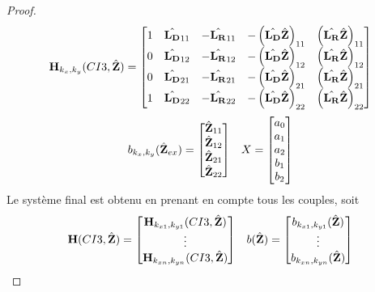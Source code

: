 \begin{proof}
  \begin{align*}
      \mathbf{H}_{k_{x},k_{y}}(CI3,\hat{\mathbf{Z}}) = \begin{bmatrix}
      1 & \hat{\mathbf{L_D}}_{11} & -\hat{\mathbf{L_R}}_{11} & -\left(\hat{\mathbf{L_D}}\hat{\mathbf{Z}}\right)_{11} & \left(\hat{\mathbf{L_R}}\hat{\mathbf{Z}}\right)_{11}
      \\
      0 & \hat{\mathbf{L_D}}_{12} & -\hat{\mathbf{L_R}}_{12} & -\left(\hat{\mathbf{L_D}}\hat{\mathbf{Z}}\right)_{12} & \left(\hat{\mathbf{L_R}}\hat{\mathbf{Z}}\right)_{12}
      \\
      0 & \hat{\mathbf{L_D}}_{21} & -\hat{\mathbf{L_R}}_{21} & -\left(\hat{\mathbf{L_D}}\hat{\mathbf{Z}}\right)_{21} & \left(\hat{\mathbf{L_R}}\hat{\mathbf{Z}}\right)_{21}
      \\
      1 & \hat{\mathbf{L_D}}_{22} & -\hat{\mathbf{L_R}}_{22} & -\left(\hat{\mathbf{L_D}}\hat{\mathbf{Z}}\right)_{22} & \left(\hat{\mathbf{L_R}}\hat{\mathbf{Z}}\right)_{22}
      \end{bmatrix}
  \end{align*}
  \begin{align*}
      b_{k_{x},k_{y}}(\hat{\mathbf{Z}}_{ex}) = \begin{bmatrix}
      \hat{\mathbf{Z}}_{11}
      \\
      \hat{\mathbf{Z}}_{12}
      \\
      \hat{\mathbf{Z}}_{21}
      \\
      \hat{\mathbf{Z}}_{22}
      \end{bmatrix} && X = \begin{bmatrix} a_0 \\ a_1 \\ a_2 \\ b_1 \\ b_2 \end{bmatrix}
  \end{align*}
  Le système final est obtenu en prenant en compte tous les couples, soit
  \begin{align*}
      \mathbf{H}(CI3,\hat{\mathbf{Z}}) = 
      \begin{bmatrix}
        \mathbf{H}_{k_{x1},k_{y1}}(CI3,\hat{\mathbf{Z}})
        \\
        \vdots
        \\
        \mathbf{H}_{k_{xn},k_{yn}}(CI3,\hat{\mathbf{Z}})
      \end{bmatrix}
      &&  b(\hat{\mathbf{Z}}) = 
      \begin{bmatrix}
        b_{k_{x1},k_{y1}}(\hat{\mathbf{Z}})
        \\
        \vdots
        \\
        b_{k_{xn},k_{yn}}(\hat{\mathbf{Z}})
      \end{bmatrix}
  \end{align*}


\end{proof}
